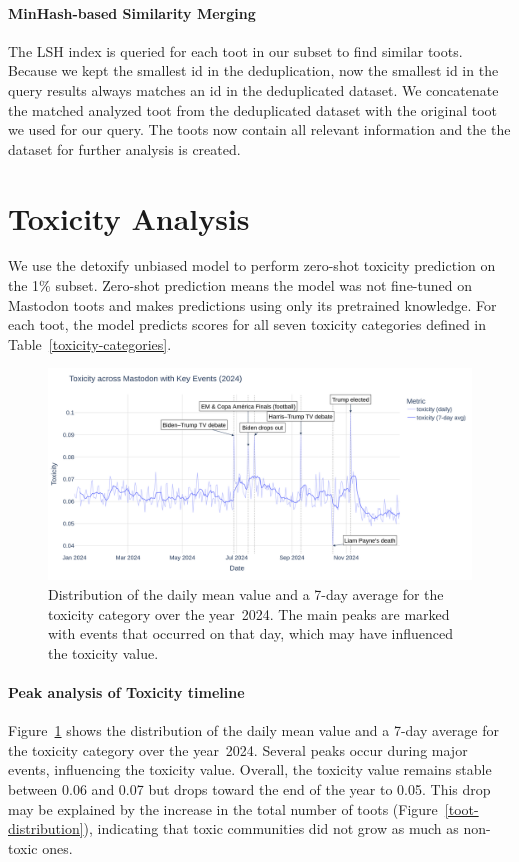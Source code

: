 \paragraph{MinHash-based Similarity Merging}\label{step:merge}
The LSH index is queried for each toot in our subset to find similar toots. Because we kept the smallest id in the deduplication, now the smallest id in the query results always matches an id in the deduplicated dataset. We concatenate the matched analyzed toot from the deduplicated dataset with the original toot we used for our query. The toots now contain all relevant information and the the dataset for further analysis is created.

\section{Toxicity Analysis}\label{step:toxicity}
We use the detoxify unbiased model to perform zero-shot toxicity prediction on the 1\% subset. Zero-shot prediction means the model was not fine-tuned on Mastodon toots and makes predictions using only its pretrained knowledge. For each toot, the model predicts scores for all seven toxicity categories defined in Table~\ref{toxicity-categories}.

\begin{figure}[tb]
    \centering
    \includegraphics[width=\textwidth]{../material/toxicity_2024.png}
    \caption{Distribution of the daily mean value and a 7-day average for the toxicity category over the year~2024. The main peaks are marked with events that occurred on that day, which may have influenced the toxicity value.}
    \label{toxicity-2024}
\end{figure}

\paragraph{Peak analysis of Toxicity timeline} 
Figure~\ref{toxicity-2024} shows the distribution of the daily mean value and a 7-day average for the toxicity category over the year~2024. Several peaks occur during major events, influencing the toxicity value. Overall, the toxicity value remains stable between 0.06 and 0.07 but drops toward the end of the year to 0.05. This drop may be explained by the increase in the total number of toots (Figure~\ref{toot-distribution}), indicating that toxic communities did not grow as much as non-toxic ones.

